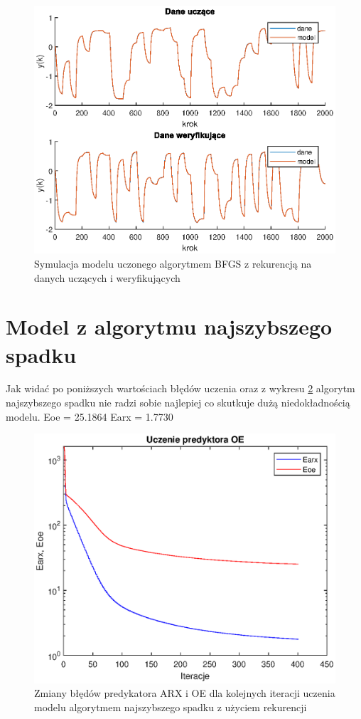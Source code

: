 		\begin{figure}[h!]
			\centering
			\includegraphics[width=\linewidth]{img/BFGS_OE_d.eps}
			\caption{Symulacja modelu uczonego algorytmem BFGS z rekurencją na danych uczących i weryfikujących}
			\label{fig:bfgs_oe_d}
		\end{figure}
		
		\newpage
	\section{Model z algorytmu najszybszego spadku}
		\label{sec:naj_sp}
		Jak widać po poniższych wartościach błędów uczenia oraz z wykresu \ref{fig:ns_oe_p} algorytm najszybszego spadku nie radzi sobie najlepiej co skutkuje dużą niedokładnością modelu.
		Eoe = 25.1864
		Earx = 1.7730
		
		\begin{figure}[h!]
			\centering
			\includegraphics[width=\linewidth]{img/NS_OE_p.eps}
			\caption{Zmiany błędów predykatora ARX i OE dla kolejnych iteracji uczenia modelu algorytmem najszybszego spadku z użyciem rekurencji}
			\label{fig:ns_oe_p}
		\end{figure}
		

